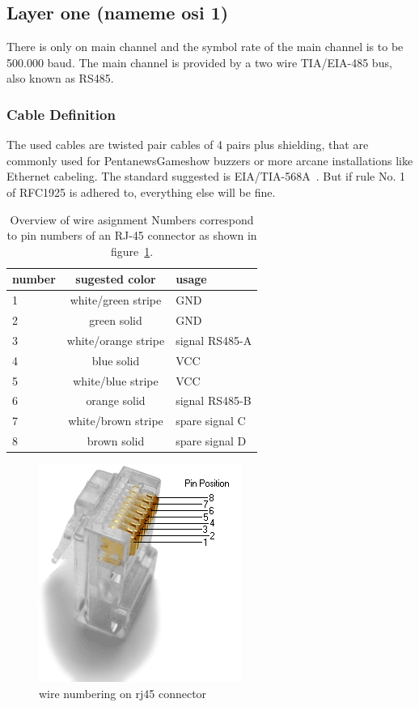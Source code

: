 \documentclass[a4paper,12pt]{scrartcl}
\begin{document}
\subsection{Layer one (nameme osi 1)}
There is only on main channel and the symbol rate of the main channel is to be 500.000 baud. 
The main channel is provided by a two wire TIA/EIA-485 \cite{EIA485} bus, also known as RS485.


\subsubsection{Cable Definition}
The used cables are twisted pair cables of 4 pairs plus shielding, that are commonly used for PentanewsGameshow buzzers
or more arcane installations like Ethernet cabeling.
The standard suggested is EIA/TIA-568A~\cite{EIA568}. But if rule No. 1 of RFC1925 \cite{RFC1925} is adhered to, everything else will be fine.

\begin{table}
	\centering
	\begin{tabular}{l c l}
		number        & sugested color      & usage \\
		\hline
		1             & white/green stripe  &   GND \\
		2             & green solid         &   GND \\
		3             & white/orange stripe &   signal RS485-A\\
		4             & blue solid          &   VCC \\
		5             & white/blue stripe   &   VCC \\
		6             & orange solid        &   signal RS485-B\\
		7             & white/brown stripe  &   spare signal C \\
		8             & brown solid         &   spare signal D \\
	\end{tabular}
	\caption{%
	Overview of wire asignment  \newline%
	Numbers correspond to pin numbers of an RJ-45 connector as shown in figure~\ref{fig:rj45}.
	}
	\label{tab:wires}
\end{table}

\begin{figure}
	\centering
	\includegraphics[scale=.7]{png/Rj45plug-8p8c.png}
	\caption{wire numbering on rj45 connector}
	\label{fig:rj45}
\end{figure}
\end{document}
